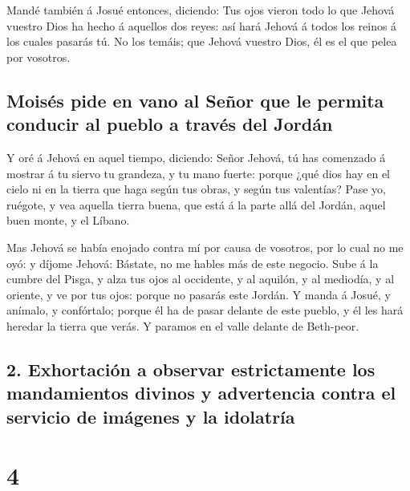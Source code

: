  Mandé también á Josué entonces, diciendo: Tus ojos vieron
todo lo que Jehová vuestro Dios ha hecho á aquellos dos reyes: así hará
Jehová á todos los reinos á los cuales pasarás tú.  No los
temáis; que Jehová vuestro Dios, él es el que pelea por vosotros.

\hypertarget{moisuxe9s-pide-en-vano-al-seuxf1or-que-le-permita-conducir-al-pueblo-a-travuxe9s-del-jorduxe1n}{%
\subsection{Moisés pide en vano al Señor que le permita conducir al
pueblo a través del
Jordán}\label{moisuxe9s-pide-en-vano-al-seuxf1or-que-le-permita-conducir-al-pueblo-a-travuxe9s-del-jorduxe1n}}

 Y oré á Jehová en aquel tiempo, diciendo: 
Señor Jehová, tú has comenzado á mostrar á tu siervo tu grandeza, y tu
mano fuerte: porque ¿qué dios hay en el cielo ni en la tierra que haga
según tus obras, y según tus valentías?  Pase yo, ruégote,
y vea aquella tierra buena, que está á la parte allá del Jordán, aquel
buen monte, y el Líbano.

 Mas Jehová se había enojado contra mí por causa de
vosotros, por lo cual no me oyó: y díjome Jehová: Bástate, no me hables
más de este negocio.  Sube á la cumbre del Pisga, y alza
tus ojos al occidente, y al aquilón, y al mediodía, y al oriente, y ve
por tus ojos: porque no pasarás este Jordán.  Y manda á
Josué, y anímalo, y confórtalo; porque él ha de pasar delante de este
pueblo, y él les hará heredar la tierra que verás.  Y
paramos en el valle delante de Beth-peor.

\hypertarget{exhortaciuxf3n-a-observar-estrictamente-los-mandamientos-divinos-y-advertencia-contra-el-servicio-de-imuxe1genes-y-la-idolatruxeda}{%
\subsection{2. Exhortación a observar estrictamente los mandamientos
divinos y advertencia contra el servicio de imágenes y la
idolatría}\label{exhortaciuxf3n-a-observar-estrictamente-los-mandamientos-divinos-y-advertencia-contra-el-servicio-de-imuxe1genes-y-la-idolatruxeda}}

\hypertarget{section-3}{%
\section{4}\label{section-3}}

